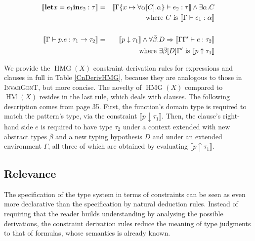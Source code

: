 \documentclass{article}
\newcommand{\tmname}[1]{\textsc{#1}}
\newcommand{\tmop}[1]{\ensuremath{\operatorname{#1}}}
\newcommand{\tmstrong}[1]{\textbf{#1}}
\begin{document}
\begin{table}[t]
\begin{eqnarray*}
    \left\llbracket \text{{\tmstrong{let}}} x = e_1  \text{{\tmstrong{in}}}
    e_2 : \tau \right\rrbracket & = & \llbracket \Gamma \{ x \mapsto \forall
    \alpha [C] . \alpha \} \vdash e_2 : \tau \rrbracket \wedge \exists \alpha
    .C\\
    &  & \text{where } C \text{ is } \llbracket \Gamma \vdash e_1 : \alpha
    \rrbracket\\
    &  & \\
    \llbracket \Gamma \vdash p.e : \tau_1 \rightarrow \tau_2 \rrbracket & = &
    \llbracket p \downarrow \tau_1 \rrbracket \wedge \forall \bar{\beta} .D
    \Rightarrow \llbracket \Gamma \Gamma^{\prime} \vdash e : \tau_2
    \rrbracket\\
    &  & \text{where } \exists \bar{\beta} [D] \Gamma^{\prime} \text{ is }
    \llbracket p \uparrow \tau_1 \rrbracket
  \end{eqnarray*}
  \label{CnDerivHMG}
  \caption{Constraint derivation for $\tmop{HMG} (X)$: expressions and
  clauses}
\end{table}

We provide the $\tmop{HMG} (X)$ constraint derivation rules for expressions
and clauses in full in Table \ref{CnDerivHMG}, because they are analogous to
those in {\tmname{InvarGenT}}, but more concise. The novelty of $\tmop{HMG}
(X)$ compared to $\tmop{HM} (X)$ resides in the last rule, which deals with
clauses. The following description comes from
{\cite{simonet-pottier-hmg-toplas}} page 35. First, the function's domain type
is required to match the pattern's type, via the constraint $\llbracket p
\downarrow \tau_1 \rrbracket$. Then, the clause's right-hand side $e$ is
required to have type $\tau_2$ under a context extended with new abstract
types $\bar{\beta}$ and a new typing hypothesis $D$ and under an extended
environment $\Gamma$, all three of which are obtained by evaluating
$\llbracket p \uparrow \tau_1 \rrbracket$.

\subsection{Relevance}

The specification of the type system in terms of constraints can be seen as
even more declarative than the specification by natural deduction rules.
Instead of requiring that the reader builds understanding by analysing the
possible derivations, the constraint derivation rules reduce the meaning of
type judgments to that of formulas, whose semantics is already known.
\end{document}
